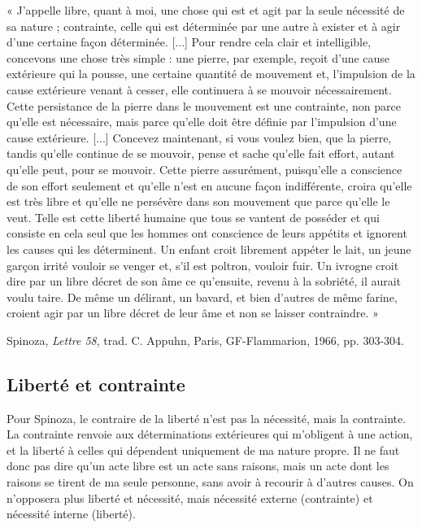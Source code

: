 « J'appelle libre, quant à moi, une chose qui est et agit par la seule nécessité de sa
nature ; contrainte, celle qui est déterminée par une autre à exister et à agir d'une
certaine façon déterminée. [...] Pour rendre cela clair et intelligible, concevons une
chose très simple : une pierre, par exemple, reçoit d'une cause extérieure qui la
pousse, une certaine quantité de mouvement et, l'impulsion de la cause extérieure
venant à cesser, elle continuera à se mouvoir nécessairement. Cette persistance de
la pierre dans le mouvement est une contrainte, non parce qu'elle est nécessaire,
mais parce qu'elle doit être définie par l'impulsion d’une cause extérieure. [...]
Concevez maintenant, si vous voulez bien, que la pierre, tandis qu’elle continue de
se mouvoir, pense et sache qu'elle fait effort, autant qu'elle peut, pour se mouvoir.
Cette pierre assurément, puisqu'elle a conscience de son effort seulement et qu’elle
n'est en aucune façon indifférente, croira qu'elle est très libre et qu’elle ne persévère dans son mouvement que parce qu’elle le veut. Telle est cette liberté humaine
que tous se vantent de posséder et qui consiste en cela seul que les hommes ont
conscience de leurs appétits et ignorent les causes qui les déterminent. Un enfant
croit librement appéter le lait, un jeune garçon irrité vouloir se venger et, s’il est poltron, vouloir fuir. Un ivrogne croit dire par un libre décret de son âme ce qu'ensuite,
revenu à la sobriété, il aurait voulu taire. De même un délirant, un bavard, et bien
d'autres de même farine, croient agir par un libre décret de leur âme et non se laisser contraindre. »

\vspace{0.25cm}
Spinoza, {\it Lettre 58}, trad. C. Appuhn, Paris, GF-Flammarion, 1966, pp. 303-304.

\subsection{Liberté et contrainte}

Pour Spinoza, le contraire de la liberté n'est pas la nécessité, mais la contrainte.
La contrainte renvoie aux déterminations extérieures qui m'obligent à une action,
et la liberté à celles qui dépendent uniquement de ma nature propre. Il ne faut
donc pas dire qu'un acte libre est un acte sans raisons, mais un acte dont les
raisons se tirent de ma seule personne, sans avoir à recourir à d’autres causes.
On n'opposera plus liberté et nécessité, mais nécessité externe (contrainte) et
nécessité interne (liberté).

